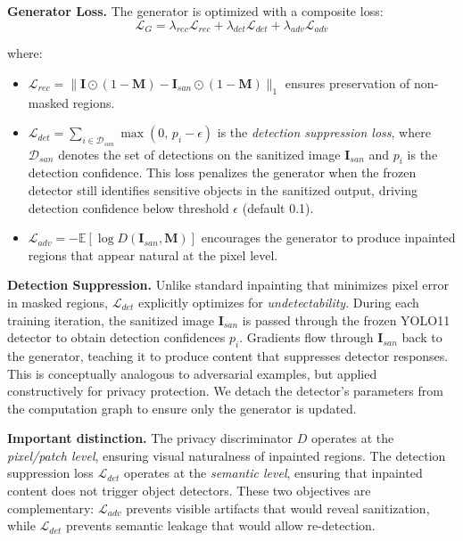 \documentclass[preprint,12pt]{elsarticle}
\begin{document}
\textbf{Generator Loss.} The generator is optimized with a composite loss:
\begin{equation}
\mathcal{L}_G = \lambda_{rec}\mathcal{L}_{rec} + \lambda_{det}\mathcal{L}_{det} + \lambda_{adv}\mathcal{L}_{adv}
\label{eq:gen_loss}
\end{equation}

where:
\begin{itemize}
    \item $\mathcal{L}_{rec} = \|\mathbf{I} \odot (1-\mathbf{M}) - \mathbf{I}_{san} \odot (1-\mathbf{M})\|_1$ ensures preservation of non-masked regions.
    \item $\mathcal{L}_{det} = \sum_{i \in \mathcal{D}_{san}} \max(0, \, p_i - \epsilon)$ is the \emph{detection suppression loss}, where $\mathcal{D}_{san}$ denotes the set of detections on the sanitized image $\mathbf{I}_{san}$ and $p_i$ is the detection confidence. This loss penalizes the generator when the frozen detector still identifies sensitive objects in the sanitized output, driving detection confidence below threshold $\epsilon$ (default 0.1).
    \item $\mathcal{L}_{adv} = -\mathbb{E}\left[\log D(\mathbf{I}_{san}, \mathbf{M})\right]$ encourages the generator to produce inpainted regions that appear natural at the pixel level.
\end{itemize}

\textbf{Detection Suppression.} Unlike standard inpainting that minimizes pixel error in masked regions, $\mathcal{L}_{det}$ explicitly optimizes for \emph{undetectability}. During each training iteration, the sanitized image $\mathbf{I}_{san}$ is passed through the frozen YOLO11 detector to obtain detection confidences $p_i$. Gradients flow through $\mathbf{I}_{san}$ back to the generator, teaching it to produce content that suppresses detector responses. This is conceptually analogous to adversarial examples, but applied constructively for privacy protection. We detach the detector's parameters from the computation graph to ensure only the generator is updated.

\textbf{Important distinction.} The privacy discriminator $D$ operates at the \emph{pixel/patch level}, ensuring visual naturalness of inpainted regions. The detection suppression loss $\mathcal{L}_{det}$ operates at the \emph{semantic level}, ensuring that inpainted content does not trigger object detectors. These two objectives are complementary: $\mathcal{L}_{adv}$ prevents visible artifacts that would reveal sanitization, while $\mathcal{L}_{det}$ prevents semantic leakage that would allow re-detection.
\end{document}
